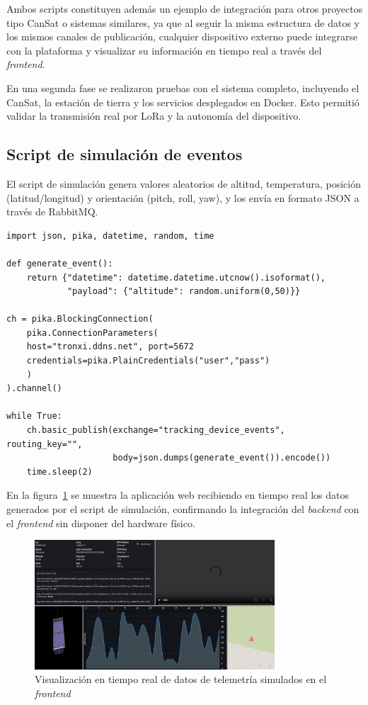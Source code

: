 Ambos scripts constituyen además un ejemplo de integración para otros proyectos tipo CanSat o sistemas similares, ya que al seguir la misma estructura de datos y los mismos canales de publicación, cualquier dispositivo externo puede integrarse con la plataforma y visualizar su información en tiempo real a través del \emph{frontend}.

En una segunda fase se realizaron pruebas con el sistema completo, incluyendo el CanSat, la estación de tierra y los servicios desplegados en Docker. Esto permitió validar la transmisión real por LoRa y la autonomía del dispositivo.

\subsection*{Script de simulación de eventos}

El script de simulación genera valores aleatorios de altitud, temperatura, posición
(latitud/longitud) y orientación (pitch, roll, yaw), y los envía en formato JSON a través
de RabbitMQ.

\begin{verbatim}
import json, pika, datetime, random, time

def generate_event():
    return {"datetime": datetime.datetime.utcnow().isoformat(),
            "payload": {"altitude": random.uniform(0,50)}}

ch = pika.BlockingConnection(
    pika.ConnectionParameters(
    host="tronxi.ddns.net", port=5672
    credentials=pika.PlainCredentials("user","pass")
    )
).channel()

while True:
    ch.basic_publish(exchange="tracking_device_events", routing_key="",
                     body=json.dumps(generate_event()).encode())
    time.sleep(2)

\end{verbatim}
En la figura~\ref{fig:frontend-simulation} se muestra la aplicación web recibiendo en tiempo real los datos generados por el script de simulación, confirmando la integración del \emph{backend} con el \emph{frontend} sin disponer del hardware físico.
\begin{figure}[H]
    \centering
    \includegraphics[width=0.8\textwidth]{Imagenes/Bitmap/datos_simulados}
    \caption{Visualización en tiempo real de datos de telemetría simulados en el \emph{frontend}}
    \label{fig:frontend-simulation}
\end{figure}

